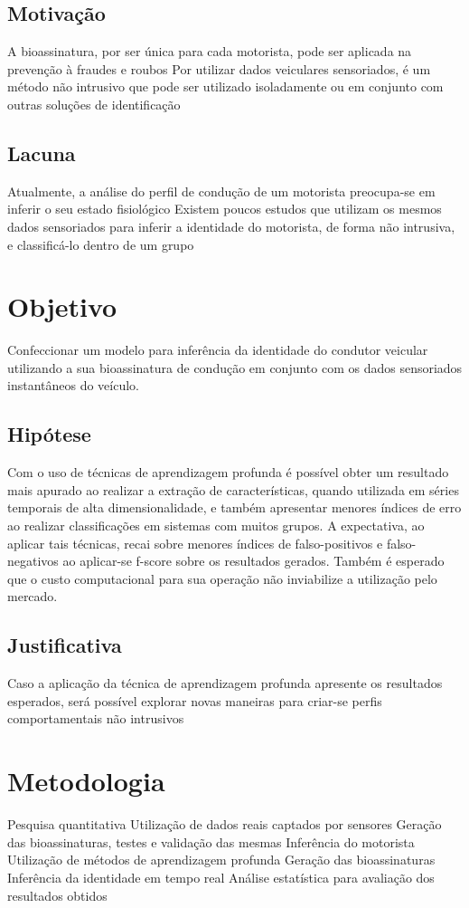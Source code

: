 \documentclass[
	12pt,				%
	oneside,			%
	a4paper,			%
	english,			%
	brazil				%
	]{abntex2ppgsi}
\begin{document}
\section{Motivação}
A bioassinatura, por ser única para cada motorista, pode ser aplicada na prevenção à fraudes e roubos
Por utilizar dados veiculares sensoriados, é um método não intrusivo que pode ser utilizado isoladamente ou em conjunto com outras soluções de identificação
\section{Lacuna}
Atualmente, a análise do perfil de condução de um motorista preocupa-se em inferir o seu estado fisiológico
Existem poucos estudos que utilizam os mesmos dados sensoriados para inferir a identidade do motorista, de forma não intrusiva, e classificá-lo dentro de um grupo
\chapter{Objetivo}
Confeccionar um modelo para inferência da identidade do condutor veicular utilizando a sua bioassinatura de condução em conjunto com os dados sensoriados instantâneos do veículo.
\section{Hipótese}
Com o uso de técnicas de aprendizagem profunda é possível obter um resultado mais apurado ao realizar a  extração de características, quando utilizada em séries temporais de alta dimensionalidade, e também apresentar menores índices de erro ao realizar classificações em sistemas com muitos grupos.
A expectativa, ao aplicar tais técnicas, recai sobre menores índices de falso-positivos e falso-negativos ao aplicar-se f-score sobre os resultados gerados. Também é esperado que o custo computacional para sua operação não inviabilize a utilização pelo mercado.
\section{Justificativa}
Caso a aplicação da técnica de aprendizagem profunda apresente os resultados esperados, será possível explorar novas maneiras para criar-se perfis comportamentais não intrusivos
\chapter{Metodologia}
Pesquisa quantitativa
Utilização de dados reais captados por sensores
  Geração das bioassinaturas, testes e validação das mesmas
  Inferência do motorista
Utilização de métodos de aprendizagem profunda
  Geração das bioassinaturas
  Inferência da identidade em tempo real
Análise estatística para avaliação dos resultados obtidos
\end{document}

